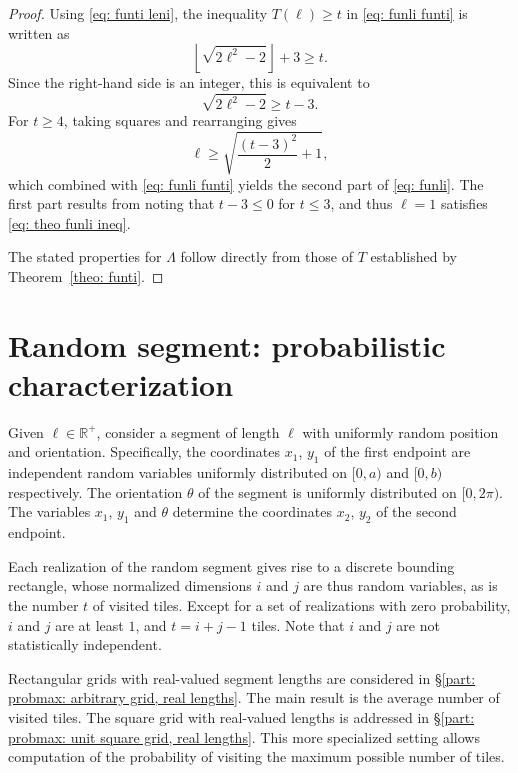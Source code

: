 \documentclass[12pt, a4paper]{article}
\newcommand{\funti}{T} %
\newcommand{\funli}{\Lambda} %
\newcommand{\len}{\ell} %
\newcommand{\leni}{\ell} %
\newcommand{\tiles}{t} %
\begin{document}
\begin{proof}
Using \eqref{eq: funti leni}, the inequality $\funti(\leni) \geq \tiles$ in \eqref{eq: funli funti} is written as
\begin{equation}
\left\lfloor \sqrt{2\leni^2-2} \right\rfloor + 3 \geq \tiles.
\end{equation}
Since the right-hand side is an integer, this is equivalent to
\begin{equation}
\label{eq: theo funli ineq}
\sqrt{2\leni^2-2} \geq \tiles-3.
\end{equation}
For $\tiles \geq 4$, taking squares and rearranging gives
\begin{equation}
\leni \geq \sqrt{\frac{(\tiles-3)^2} 2 + 1},
\end{equation}
which combined with \eqref{eq: funli funti} yields the second part of \eqref{eq: funli}. The first part results from noting that $\tiles-3 \leq 0$ for $\tiles \leq 3$, and thus $\leni=1$ satisfies \eqref{eq: theo funli ineq}.

The stated properties for $\funli$ follow directly from those of $\funti$ established by Theorem~\ref{theo: funti}.
\end{proof}


\section{Random segment: probabilistic characterization}
\label{part: rand}

Given $\len \in \mathbb R^+$, consider a segment of length $\len$ with uniformly random position and orientation. Specifically, the coordinates $x_1$, $y_1$ of the first endpoint are independent random variables uniformly distributed on $[0,a)$ and $[0,b)$ respectively. The orientation $\theta$ of the segment is uniformly distributed on $[0,2\pi)$. The variables $x_1$, $y_1$ and $\theta$ determine the coordinates $x_2$, $y_2$ of the second endpoint.

Each realization of the random segment gives rise to a discrete bounding rectangle, whose normalized dimensions $i$ and $j$ are thus random variables, as is the number $\tiles$ of visited tiles. Except for a set of realizations with zero probability, $i$ and $j$ are at least $1$, and $\tiles = i+j-1$ tiles. Note that $i$ and $j$ are not statistically independent.

Rectangular grids with real-valued segment lengths are considered in \S\ref{part: probmax: arbitrary grid, real lengths}. The main result is the average number of visited tiles. The square grid with real-valued lengths is addressed in \S\ref{part: probmax: unit square grid, real lengths}. This more specialized setting allows computation of the probability of visiting the maximum possible number of tiles.
\end{document}
